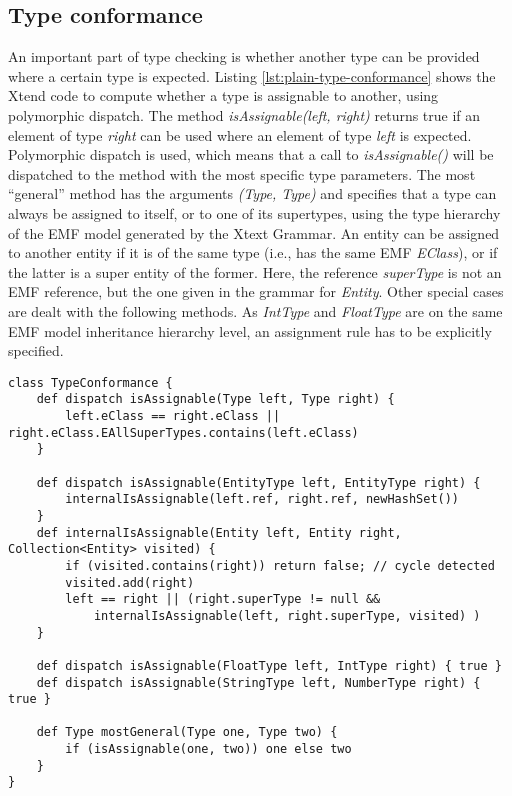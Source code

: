 %

\subsection{Type conformance}
\label{sec:typeconformance}

An important part of type checking is whether another type can be provided where
a certain type is expected.
Listing \ref{lst:plain-type-conformance} shows the Xtend code to compute whether
a type is assignable to another, using polymorphic dispatch. The method
\emph{isAssignable(left, right)} returns true if an element of type \emph{right}
can be used where an element of type \emph{left} is expected.
Polymorphic dispatch is used, which means that a call to \emph{isAssignable()}
will be dispatched to the method with the most specific type parameters. The
most ``general'' method has the arguments \emph{(Type, Type)} and specifies that
a type can always be assigned to itself, or to one of its supertypes, using the
type hierarchy of the EMF model generated by the Xtext Grammar.
An entity can be assigned to another entity if it is of the same type (i.e., has
the same EMF \emph{EClass}), or if the latter is a super entity of the former.
Here, the reference \emph{superType} is not an EMF reference, but the one given
in the grammar for \emph{Entity}. Other special cases are dealt with the
following methods. As \emph{IntType} and \emph{FloatType} are on the same EMF
model inheritance hierarchy level, an assignment rule has to be explicitly
specified.

\begin{lstlisting}[language=xtend,float=tb,label=lst:plain-type-conformance,caption=Type
conformance specification (Xtend code).] 
class TypeConformance {
	def dispatch isAssignable(Type left, Type right) {
		left.eClass == right.eClass || right.eClass.EAllSuperTypes.contains(left.eClass) 
	}

	def dispatch isAssignable(EntityType left, EntityType right) {
		internalIsAssignable(left.ref, right.ref, newHashSet())
	}
	def internalIsAssignable(Entity left, Entity right, Collection<Entity> visited) {
		if (visited.contains(right)) return false; // cycle detected
		visited.add(right)
		left == right || (right.superType != null && 
			internalIsAssignable(left, right.superType, visited) )
	}
	
	def dispatch isAssignable(FloatType left, IntType right) { true }
	def dispatch isAssignable(StringType left, NumberType right) { true }

	def Type mostGeneral(Type one, Type two) {
		if (isAssignable(one, two)) one else two
	}
}
\end{lstlisting}

